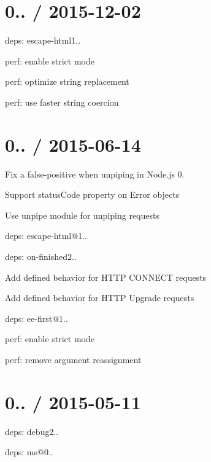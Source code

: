 \section*{0.. / 2015-\/12-\/02 }


\begin{DoxyItemize}
\item deps\+: escape-\/html1..
\begin{DoxyItemize}
\item perf\+: enable strict mode
\item perf\+: optimize string replacement
\item perf\+: use faster string coercion
\end{DoxyItemize}
\end{DoxyItemize}

\section*{0.. / 2015-\/06-\/14 }


\begin{DoxyItemize}
\item Fix a false-\/positive when unpiping in Node.\+js 0.
\item Support {\ttfamily status\+Code} property on {\ttfamily Error} objects
\item Use {\ttfamily unpipe} module for unpiping requests
\item deps\+: escape-\/html@1..
\item deps\+: on-\/finished2..
\begin{DoxyItemize}
\item Add defined behavior for H\+T\+TP {\ttfamily C\+O\+N\+N\+E\+CT} requests
\item Add defined behavior for H\+T\+TP {\ttfamily Upgrade} requests
\item deps\+: ee-\/first@1..
\end{DoxyItemize}
\item perf\+: enable strict mode
\item perf\+: remove argument reassignment
\end{DoxyItemize}

\section*{0.. / 2015-\/05-\/11 }


\begin{DoxyItemize}
\item deps\+: debug2..
\begin{DoxyItemize}
\item deps\+: ms@0..
\end{DoxyItemize}
\end{DoxyItemize}

